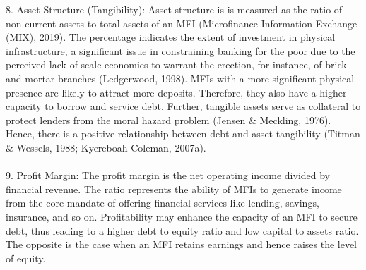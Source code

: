 \documentclass[
]{article}
\begin{document}
\begin{longtabu}
8. Asset Structure (Tangibility): Asset structure is is measured as the ratio of non-current assets to total assets of an MFI (Microfinance Information Exchange (MIX), 2019). The percentage indicates the extent of investment in physical infrastructure, a significant issue in constraining banking for the poor due to the perceived lack of scale economies to warrant the erection, for instance, of brick and mortar branches (Ledgerwood, 1998). MFIs with a more significant physical presence are likely to attract more deposits. Therefore, they also have a higher capacity to borrow and service debt. Further, tangible assets serve as collateral to protect lenders from the moral hazard problem (Jensen \& Meckling, 1976). Hence, there is a positive relationship between debt and asset tangibility (Titman \& Wessels, 1988; Kyereboah-Coleman, 2007a).\\
\addlinespace
\\
9. Profit Margin: The profit margin is the net operating income divided by financial revenue. The ratio represents the ability of MFIs to generate income from the core mandate of offering financial services like lending, savings, insurance, and so on. Profitability may enhance the capacity of an MFI to secure debt, thus leading to a higher debt to equity ratio and low capital to assets ratio. The opposite is the case when an MFI retains earnings and hence raises the level of equity.\\
\\
\bottomrule
{}\\
\\
\\
\\
\\
\\
\\
\end{longtabu}
\end{document}
